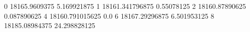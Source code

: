 0 18165.9609375 5.169921875
1 18161.341796875 0.55078125
2 18160.87890625 0.087890625
4 18160.791015625 0.0
6 18167.29296875 6.501953125
8 18185.08984375 24.298828125
